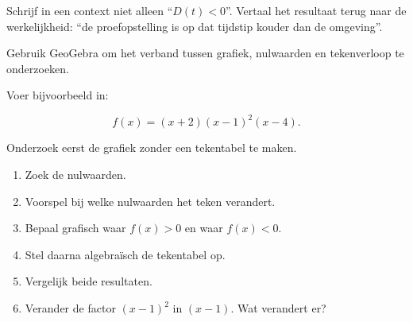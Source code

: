 \documentclass{ximera}
\begin{document}
\begin{opmerking}[Demathematiseren]
Schrijf in een context niet alleen
``\(D(t)<0\)''.
Vertaal het resultaat terug naar de werkelijkheid:
``de proefopstelling is op dat tijdstip kouder dan de omgeving''.
\end{opmerking}





Gebruik GeoGebra om het verband tussen grafiek, nulwaarden
en tekenverloop te onderzoeken.

\begin{geogebra}
Voer bijvoorbeeld in:

\[
f(x)=(x+2)(x-1)^2(x-4).
\]

Onderzoek eerst de grafiek zonder een tekentabel te maken.

\begin{enumerate}
    \item Zoek de nulwaarden.
    \item Voorspel bij welke nulwaarden het teken verandert.
    \item Bepaal grafisch waar \(f(x)>0\) en waar \(f(x)<0\).
    \item Stel daarna algebraïsch de tekentabel op.
    \item Vergelijk beide resultaten.
    \item Verander de factor \((x-1)^2\) in \((x-1)\). Wat verandert er?
\end{enumerate}
\end{geogebra}
\end{document}
